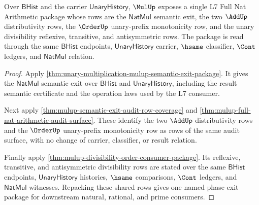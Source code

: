 \begin{theorem}
\label{thm:mulup-add-order-divisibility-phase-exit-package}
Over $\mathsf{BHist}$ and the carrier $\mathsf{UnaryHistory}$, $\MulUp$
exposes a single L7 Full Nat Arithmetic package whose rows are the
$\mathsf{NatMul}$ semantic exit, the two $\AddUp$ distributivity rows, the
$\OrderUp$ unary-prefix monotonicity row, and the unary divisibility
reflexive, transitive, and antisymmetric rows. The package is read through the
same $\mathsf{BHist}$ endpoints, $\mathsf{UnaryHistory}$ carrier, $\hsame$
classifier, $\Cont$ ledgers, and $\mathsf{NatMul}$ relation.
\end{theorem}
\begin{proof}
Apply \autoref{thm:unary-multiplication-mulup-semantic-exit-package}. It gives
the $\mathsf{NatMul}$ semantic exit over $\mathsf{BHist}$ and
$\mathsf{UnaryHistory}$, including the result semantic certificate and the
operation laws used by the L7 consumer.

Next apply \autoref{thm:mulup-semantic-exit-audit-row-coverage} and
\autoref{thm:mulup-full-nat-arithmetic-audit-surface}. These identify the two
$\AddUp$ distributivity rows and the $\OrderUp$ unary-prefix monotonicity row
as rows of the same audit surface, with no change of carrier, classifier, or
result relation.

Finally apply \autoref{thm:mulup-divisibility-order-consumer-package}. Its
reflexive, transitive, and antisymmetric divisibility rows are stated over the
same $\mathsf{BHist}$ endpoints, $\mathsf{UnaryHistory}$ histories, $\hsame$
comparisons, $\Cont$ ledgers, and $\mathsf{NatMul}$ witnesses. Repacking these
shared rows gives one named phase-exit package for downstream natural,
rational, and prime consumers.
\end{proof}

